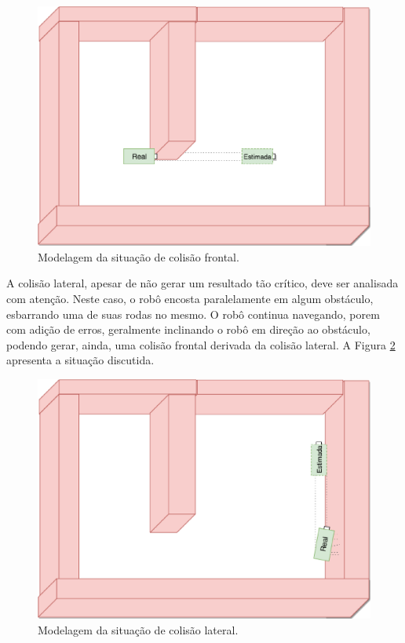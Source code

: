 \begin{figure}[H]
  \centering
  \includegraphics[scale=0.5]{figuras/colisao_frontal.eps}
  \caption{Modelagem da situação de colisão frontal.}
  \label{img:colisao_frontal}
\end{figure}

A colisão lateral, apesar de não gerar um resultado tão crítico, deve ser analisada com atenção. Neste caso, o robô encosta paralelamente em algum
obstáculo, esbarrando uma de suas rodas no mesmo. O robô continua navegando, porem com adição de erros, geralmente inclinando
o robô em direção ao obstáculo, podendo gerar, ainda, uma colisão frontal derivada da colisão lateral. A Figura \ref{img:colisao_lateral}
apresenta a situação discutida.

\begin{figure}[H]
  \centering
  \includegraphics[scale=0.5]{figuras/colisao_lateral.eps}
  \caption{Modelagem da situação de colisão lateral.}
  \label{img:colisao_lateral}
\end{figure}

